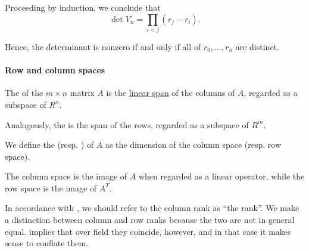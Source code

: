 \begin{example}
  Proceeding by induction, we conclude that
  \begin{equation}\label{eq:ex:vandermonde_matrix/determinant}
    \det V_n = \prod_{i < j} (r_j - r_i).
  \end{equation}

  Hence, the determinant is nonzero if and only if all of \( r_0, \ldots, r_n \) are distinct.
\end{example}

\paragraph{Row and column spaces}

\begin{definition}\label{def:column_and_row_spaces}
  The  of the \( m \times n \) matrix \( A \) is the \hyperref[def:module/submodel]{linear span} of the columns of \( A \), regarded as a subspace of \( R^n \).

  Analogously, the  is the span of the rows, regarded as a subspace of \( R^m \).

  We define the  (resp. ) of \( A \) as the dimension of the column space (resp. row space).
\end{definition}
\begin{comments}
  \item The column space is the image of \( A \) when regarded as a linear operator, while the row space is the image of \( A^T \).

  \item In accordance with , we should refer to the column rank as \enquote{the rank}. We make a distinction between column and row ranks because the two are not in general equal.  implies that over field they coincide, however, and in that case it makes sense to conflate them.
\end{comments}

